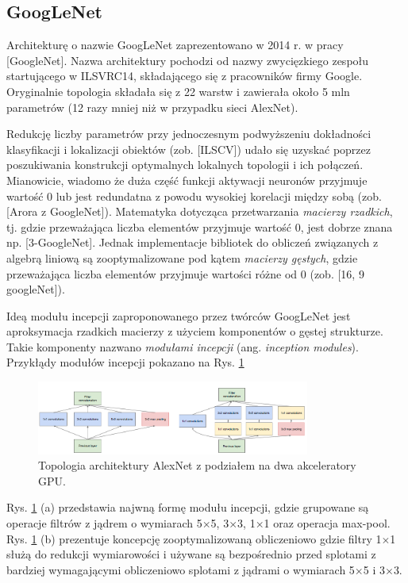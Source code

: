\subsection{GoogLeNet}

Architekturę o nazwie GoogLeNet zaprezentowano w 2014 r. w pracy [GoogleNet]. Nazwa architektury pochodzi od nazwy zwycięzkiego zespołu startującego w ILSVRC14, składającego się z pracowników firmy Google. Oryginalnie topologia składała się z 22 warstw i zawierała około 5 mln parametrów (12 razy mniej niż w przypadku sieci AlexNet). 

Redukcję liczby parametrów przy jednoczesnym podwyższeniu dokładności klasyfikacji i lokalizacji obiektów (zob. [ILSCV]) udało się uzyskać poprzez poszukiwania konstrukcji optymalnych lokalnych topologii i ich połączeń. Mianowicie, wiadomo że duża część funkcji aktywacji neuronów przyjmuje wartość 0 lub jest redundatna z powodu wysokiej korelacji między sobą (zob. [Arora z GoogleNet]). Matematyka dotycząca przetwarzania \textit{macierzy rzadkich}, tj. gdzie przeważająca liczba elementów przyjmuje wartość 0, jest dobrze znana np. [3-GoogleNet]. Jednak implementacje bibliotek do obliczeń związanych z algebrą liniową są zooptymalizowane pod kątem \textit{macierzy gęstych}, gdzie przeważająca liczba elementów przyjmuje wartości różne od 0 (zob. [16, 9 googleNet]). 

Ideą modułu incepcji zaproponowanego przez twórców GoogLeNet jest aproksymacja rzadkich macierzy z użyciem komponentów o gęstej strukturze. Takie komponenty nazwano \textit{modułami incepcji} (ang. \textit{inception modules}). Przykłądy modułów incepcji pokazano na Rys. \ref{GoogleNetInceptionModules} 
\begin{figure}[h!]
	\centering
	\includegraphics[width=0.8\textwidth]{figures/InceptionModules.png}
	\caption{Topologia architektury AlexNet z podziałem na dwa akceleratory GPU.}
	\label{GoogleNetInceptionModules}
\end{figure}

Rys. \ref{GoogleNetInceptionModules} (a) przedstawia najwną formę modułu incepcji, gdzie grupowane są operacje filtrów z jądrem o wymiarach 5$\times$5, 3$\times$3, 1$\times$1 oraz operacja max-pool. Rys. \ref{GoogleNetInceptionModules} (b) prezentuje koncepcję zooptymalizowaną obliczeniowo gdzie filtry 1$\times$1 służą do redukcji wymiarowości i używane są bezpośrednio przed splotami z bardziej wymagającymi obliczeniowo splotami z jądrami o wymiarach 5$\times$5 i 3$\times$3. 

